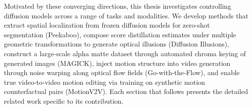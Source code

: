 Motivated by these converging directions, this thesis investigates controlling diffusion models across a range of tasks and modalities. We develop methods that extract spatial localization from frozen diffusion models for zero-shot segmentation (Peekaboo), compose score distillation estimates under multiple geometric transformations to generate optical illusions (Diffusion Illusions), construct a large-scale alpha matte dataset through automated chroma keying of generated images (MAGICK), inject motion structure into video generation through noise warping along optical flow fields (Go-with-the-Flow), and enable true video-to-video motion editing via training on synthetic motion counterfactual pairs (MotionV2V). Each section that follows presents the detailed related work specific to its contribution.










